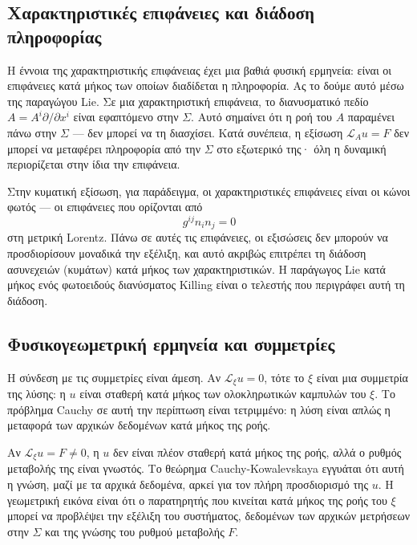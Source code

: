 \documentclass[12pt]{article}
\begin{document}
\subsection{Χαρακτηριστικές επιφάνειες και διάδοση πληροφορίας}

Η έννοια της χαρακτηριστικής επιφάνειας έχει μια βαθιά φυσική ερμηνεία: είναι οι επιφάνειες κατά μήκος των οποίων διαδίδεται η πληροφορία. Ας το δούμε αυτό μέσω της παραγώγου Lie. Σε μια χαρακτηριστική επιφάνεια, το διανυσματικό πεδίο $A = A^i \partial / \partial x^i$ είναι εφαπτόμενο στην $\Sigma$. Αυτό σημαίνει ότι η ροή του $A$ παραμένει πάνω στην $\Sigma$ — δεν μπορεί να τη διασχίσει. Κατά συνέπεια, η εξίσωση $\mathcal{L}_A u = F$ δεν μπορεί να μεταφέρει πληροφορία από την $\Sigma$ στο εξωτερικό της· όλη η δυναμική περιορίζεται στην ίδια την επιφάνεια.

Στην κυματική εξίσωση, για παράδειγμα, οι χαρακτηριστικές επιφάνειες είναι οι κώνοι φωτός — οι επιφάνειες που ορίζονται από
\begin{equation}
g^{ij} n_i n_j = 0
\end{equation}
στη μετρική Lorentz. Πάνω σε αυτές τις επιφάνειες, οι εξισώσεις δεν μπορούν να προσδιορίσουν μοναδικά την εξέλιξη, και αυτό ακριβώς επιτρέπει τη διάδοση ασυνεχειών (κυμάτων) κατά μήκος των χαρακτηριστικών. Η παράγωγος Lie κατά μήκος ενός φωτοειδούς διανύσματος Killing είναι ο τελεστής που περιγράφει αυτή τη διάδοση.

\subsection{Φυσικογεωμετρική ερμηνεία και συμμετρίες}

Η σύνδεση με τις συμμετρίες είναι άμεση. Αν $\mathcal{L}_\xi u = 0$, τότε το $\xi$ είναι μια συμμετρία της λύσης: η $u$ είναι σταθερή κατά μήκος των ολοκληρωτικών καμπυλών του $\xi$. Το πρόβλημα Cauchy σε αυτή την περίπτωση είναι τετριμμένο: η λύση είναι απλώς η μεταφορά των αρχικών δεδομένων κατά μήκος της ροής.

Αν $\mathcal{L}_\xi u = F \neq 0$, η $u$ δεν είναι πλέον σταθερή κατά μήκος της ροής, αλλά ο ρυθμός μεταβολής της είναι γνωστός. Το θεώρημα Cauchy-Kowalevskaya εγγυάται ότι αυτή η γνώση, μαζί με τα αρχικά δεδομένα, αρκεί για τον πλήρη προσδιορισμό της $u$. Η γεωμετρική εικόνα είναι ότι ο παρατηρητής που κινείται κατά μήκος της ροής του $\xi$ μπορεί να προβλέψει την εξέλιξη του συστήματος, δεδομένων των αρχικών μετρήσεων στην $\Sigma$ και της γνώσης του ρυθμού μεταβολής $F$.
\end{document}
